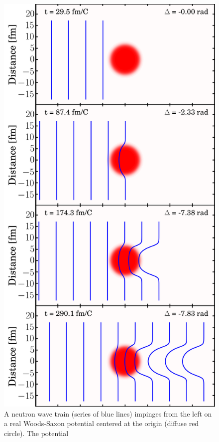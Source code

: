\begin{figure}
    \includegraphics[scale=0.2]{figures/phaseShiftStillsFigure.png}
    \caption[A illustration of the nuclear Ramsauer effect]{
        A neutron wave train (series of
        blue lines) impinges from the left on a real Woods-Saxon
        potential centered at the origin (diffuse red circle). The potential
}
\end{figure}
